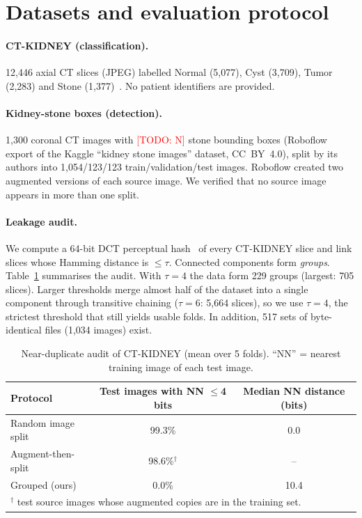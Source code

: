 \documentclass[11pt]{article}
\newcommand{\todo}[1]{\textcolor{red}{[TODO: #1]}}
\begin{document}
\section{Datasets and evaluation protocol}\label{sec:protocol}
\paragraph{CT-KIDNEY (classification).} 12,446 axial CT slices (JPEG) labelled Normal (5,077), Cyst (3,709),
Tumor (2,283) and Stone (1,377)~\citep{islam2022vision}. No patient identifiers are provided.

\paragraph{Kidney-stone boxes (detection).} 1,300 coronal CT images with \todo{N} stone bounding boxes
(Roboflow export of the Kaggle ``kidney stone images'' dataset, CC~BY~4.0), split by its authors into
1,054/123/123 train/validation/test images. Roboflow created two augmented versions of each source image. We
verified that no source image appears in more than one split.

\paragraph{Leakage audit.} We compute a 64-bit DCT perceptual hash~\citep{zauner2010phash} of every CT-KIDNEY
slice and link slices whose Hamming distance is $\le\tau$. Connected components form \emph{groups}. Table~\ref{tab:audit}
summarises the audit. With $\tau{=}4$ the data form 229 groups (largest: 705 slices). Larger thresholds merge
almost half of the dataset into a single component through transitive chaining ($\tau{=}6$: 5,664 slices), so we
use $\tau{=}4$, the strictest threshold that still yields usable folds. In addition, 517 sets of byte-identical
files (1,034 images) exist.

\begin{table}[t]\centering
\caption{Near-duplicate audit of CT-KIDNEY (mean over 5 folds). ``NN'' = nearest training image of each test image.}
\label{tab:audit}
\begin{tabular}{lcc}\toprule
Protocol & Test images with NN $\le$4 bits & Median NN distance (bits) \\\midrule
Random image split & 99.3\% & 0.0 \\
Augment-then-split~\citep{devi2025cdr} & 98.6\%$^\dagger$ & -- \\
Grouped (ours) & 0.0\% & 10.4 \\\bottomrule
\multicolumn{3}{l}{\footnotesize $^\dagger$ test source images whose augmented copies are in the training set.}
\end{tabular}
\end{table}
\end{document}
